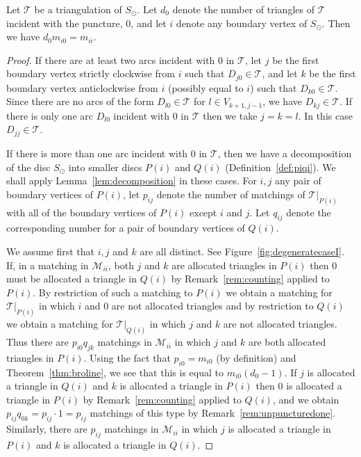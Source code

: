 \documentclass[a4paper]{amsart}
\begin{document}
\begin{lemma} \label{lem:degeneratecase}
Let ${\mathcal T}$ be a triangulation of $S_{\odot}$.
Let $d_0$ denote the number of triangles of ${\mathcal T}$ incident with the puncture,
$0$, and let $i$ denote any boundary vertex of $S_{\odot}$.
Then we have $d_0m_{i0}=m_{ii}$.
\end{lemma}
\begin{proof}
If there are at least two arcs incident with $0$ in ${\mathcal T}$, let $j$ be the
first boundary vertex strictly clockwise from $i$ such that $D_{j0}\in {\mathcal T}$,
and let $k$ be the first boundary vertex anticlockwise from $i$
(possibly equal to $i$) such that $D_{k0}\in {\mathcal T}$.
Since there are no arcs of the form $D_{l0}\in {\mathcal T}$ for $l\in V_{k+1,j-1}$,
we have $D_{kj}\in {\mathcal T}$.
If there is only one arc $D_{l0}$ incident with $0$ in ${\mathcal T}$ then we
take $j=k=l$. In this case $D_{jj}\in {\mathcal T}$.

If there is more than one arc incident with $0$ in ${\mathcal T}$, then we have a
decomposition of the disc $S_{\odot}$ into smaller discs $P(i)$ and $Q(i)$
(Definition~\ref{def:piqi}).
We shall apply Lemma~\ref{lem:decomposition} in these cases.
For $i,j$ any pair of boundary vertices of $P(i)$, let $p_{ij}$ denote
the number of matchings of ${\mathcal T}|_{P(i)}$ with all of the boundary vertices of
$P(i)$ except $i$ and $j$. Let $q_{ij}$ denote the corresponding number for
a pair of boundary vertices of $Q(i)$.

We assume first that $i,j$ and $k$ are all distinct.
See Figure~\ref{fig:degeneratecaseI}.
If, in a matching in ${\mathcal M}_{ii}$, both $j$ and $k$ are allocated triangles in
$P(i)$ then $0$ must be allocated a triangle in $Q(i)$ by
Remark~\ref{rem:counting} applied to $P(i)$.
By restriction of such a matching to $P(i)$ we obtain a matching
for ${\mathcal T}|_{P(i)}$ in which $i$ and $0$ are not allocated triangles
and by restriction to $Q(i)$ we obtain a matching for ${\mathcal T}|_{Q(i)}$ in
which $j$ and $k$ are not allocated triangles.
Thus there are $p_{i0}q_{jk}$ matchings in ${\mathcal M}_{ii}$ in which
$j$ and $k$ are both allocated triangles in $P(i)$.
Using the fact that $p_{i0}=m_{i0}$
(by definition) and Theorem~\ref{thm:broline}, we see that this is equal to
$m_{i0}(d_0-1)$.
If $j$ is allocated a triangle
in $Q(i)$ and $k$ is allocated a triangle in $P(i)$ then $0$ is allocated
a triangle in $P(i)$ by Remark~\ref{rem:counting} applied to $Q(i)$, and we
obtain
$p_{ij}q_{0k}=p_{ij}\cdot 1=p_{ij}$ matchings of this type by
Remark~\ref{rem:unpuncturedone}.
Similarly, there are $p_{ij}$ matchings in ${\mathcal M}_{ii}$ in which
$j$ is allocated a triangle in $P(i)$ and $k$ is allocated a triangle in
$Q(i)$.


\end{proof}
\end{document}
